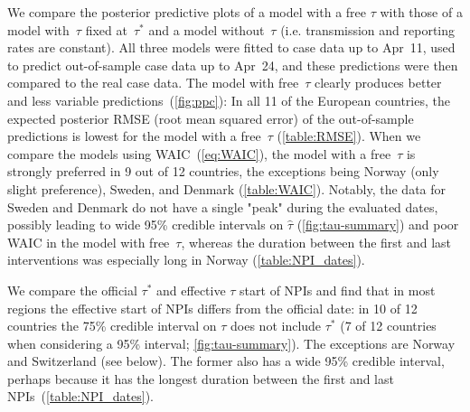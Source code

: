 \documentclass[12pt]{extarticle}
\begin{document}
We compare the posterior predictive plots of a model with a free $\tau$ with those of a model with~$\tau$ fixed at~$\tau^*$ and a model without~$\tau$ (i.e. transmission and reporting rates are constant).
All three models were fitted to case data up to Apr~11, used to predict out-of-sample case data up to Apr~24, and these predictions were then compared to the real case data. 
The model with free~$\tau$ clearly produces better and less variable predictions~(\autoref{fig:ppc}):
In all 11 of the European countries, the expected posterior RMSE (root mean squared error) of the out-of-sample predictions is lowest for the model with a free~$\tau$ (\autoref{table:RMSE}).
When we compare the models using WAIC~(\autoref{eq:WAIC}), the model with a free~$\tau$ is strongly preferred in 9 out of 12 countries, the exceptions being Norway (only slight preference), Sweden, and Denmark (\autoref{table:WAIC}).
Notably, the data for Sweden and Denmark do not have a single "peak" during the evaluated dates, possibly leading to wide 95\% credible intervals on $\hat{\tau}$ (\autoref{fig:tau-summary}) and poor WAIC in the model with free~$\tau$, whereas the duration between the first and last interventions was especially long in Norway (\autoref{table:NPI_dates}).

We compare the official $\tau^*$ and effective $\tau$ start of NPIs and find that in most regions the effective start of NPIs differs from the official date: in 10 of 12 countries the 75\% credible interval on $\tau$ does not include $\tau^*$ (7 of 12 countries when considering a 95\% interval; \autoref{fig:tau-summary}).
The exceptions are Norway and Switzerland (see below).
The former also has a wide 95\% credible interval, perhaps because it has the longest duration between the first and last NPIs~(\autoref{table:NPI_dates}).
\end{document}
